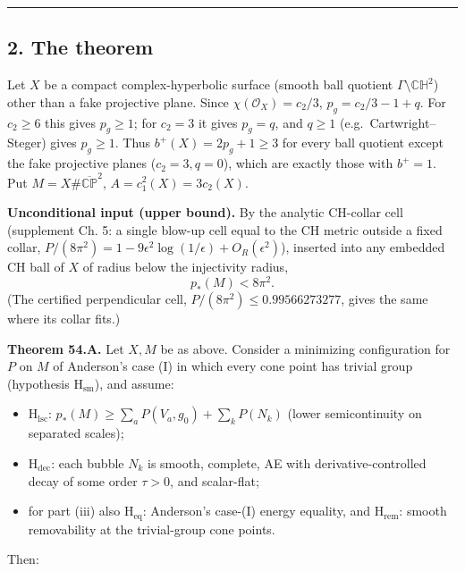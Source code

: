 \documentclass[
  10pt,
]{report}
\providecommand{\tightlist}{%
  \setlength{\itemsep}{0pt}\setlength{\parskip}{0pt}}
\renewcommand{\backslash}{\mathord{\text{\textbackslash}}}%
\begin{document}
\begin{center}\rule{0.5\linewidth}{0.5pt}\end{center}

\hypertarget{the-theorem}{%
\subsection{2. The theorem}\label{the-theorem}}

Let \(X\) be a compact complex-hyperbolic surface (smooth ball quotient
\(\Gamma\backslash\mathbb{CH}^2\)) other than a fake projective plane.
Since \(\chi(\mathcal O_X)=c_2/3\), \(p_g=c_2/3-1+q\). For \(c_2\ge6\)
this gives \(p_g\ge1\); for \(c_2=3\) it gives \(p_g=q\), and \(q\ge1\)
(e.g.~Cartwright--Steger) gives \(p_g\ge1\). Thus \(b^+(X)=2p_g+1\ge3\)
for every ball quotient except the fake projective planes
(\(c_2=3,q=0\)), which are exactly those with \(b^+=1\). Put
\(M=X\#\overline{\mathbb{CP}}^2\), \(A=c_1^2(X)=3c_2(X)\).

\textbf{Unconditional input (upper bound).} By the analytic CH-collar
cell (supplement Ch. 5: a single blow-up cell equal to the CH metric
outside a fixed collar,
\(P/(8\pi^2)=1-9\epsilon^2\log(1/\epsilon)+O_R(\epsilon^2)\)), inserted
into any embedded CH ball of \(X\) of radius below the injectivity
radius, \[
p_*(M)<8\pi^2 .\tag{U}
\] (The certified perpendicular cell, \(P/(8\pi^2)\le0.99566273277\),
gives the same where its collar fits.)

\textbf{Theorem 54.A.} Let \(X,M\) be as above. Consider a minimizing
configuration for \(P\) on \(M\) of Anderson's case (I) in which every
cone point has trivial group (hypothesis \(\mathrm{H_{sm}}\)), and
assume:

\begin{itemize}
\tightlist
\item
  \(\mathrm{H_{lsc}}\): \(p_*(M)\ge\sum_aP(V_a,g_0)+\sum_kP(N_k)\)
  (lower semicontinuity on separated scales);
\item
  \(\mathrm{H_{dec}}\): each bubble \(N_k\) is smooth, complete, AE with
  derivative-controlled decay of some order \(\tau>0\), and scalar-flat;
\item
  for part (iii) also \(\mathrm{H_{eq}}\): Anderson's case-(I) energy
  equality, and \(\mathrm{H_{rem}}\): smooth removability at the
  trivial-group cone points.
\end{itemize}

Then:
\end{document}
